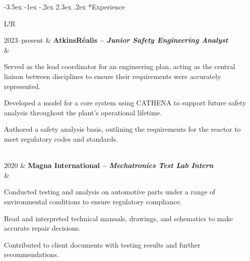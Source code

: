 \documentclass[a4paper,10pt]{article}
\makeatletter
\newcommand\heading{\bfseries\scshape\color{LightBlack}}
\newcommand\headingTwo{\heading\Large}
\newcommand{\bold}[1]{\textbf{\textcolor{LightBlack}{#1}}}
\renewcommand\section{\@startsection {section}{1}{0cm}%
                                   {-3.5ex \@plus -1ex \@minus -.2ex}%
                                   {2.3ex \@plus.2ex}%
                                   {\headingTwo}}
\newcommand\VerticalRule{\color{Periwinkle!50}\vrule width 0.5pt}
\newenvironment{sectiontable}
{
	\begin{tabular}{L!{\VerticalRule}R}
}
{
	\end{tabular}
}
\makeatother
\begin{document}
\section*{Experience}
\begin{sectiontable}
	2023--present & \bold{AtkinsRéalis -- \textit{Junior Safety Engineering Analyst}}                                                                                                                                                                                                            \\
	              & \begin{items}
						\item Served as the lead coordinator for an engineering plan, acting as the central liaison between disciplines to ensure their requirements were accurately represented.
						\item Developed a model for a core system using CATHENA to support future safety analysis throughout the plant's operational lifetime.
						\item Authored a safety analysis basis, outlining the requirements for the reactor to meet regulatory codes and standards.
	                \end{items} \\

		 2020  & \bold{Magna International --  \textit{Mechatronics Test Lab Intern}}                                                                                                                                                                                                    \\
				  & \begin{items}
					   \item Conducted testing and analysis on automotive parts under a range of environmental conditions to ensure regulatory compliance.
					   \item Read and interpreted technical manuals, drawings, and schematics to make accurate repair decisions.
					   \item Contributed to client documents with testing results and further recommendations.
					\end{items}   
\end{sectiontable}
\end{document}
